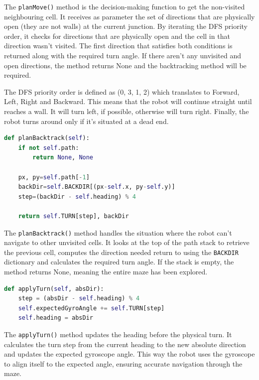 The \texttt{planMove()} method is the decision-making function to get the non-visited neighbouring cell. It receives as parameter the set of directions that are physically open (they are not walls) at the current junction. By iterating the DFS priority order, it checks for directions that are physically open and the cell in that direction wasn’t visited. The first direction that satisfies both conditions is returned along with the required turn angle. If there aren’t any unvisited and open directions, the method returns None and the backtracking method will be required.

The DFS priority order is defined as (0, 3, 1, 2) which translates to Forward, Left, Right and Backward. This means that the robot will continue straight until reaches a wall. It will turn left, if possible, otherwise will turn right. Finally, the robot turns around only if it’s situated at a dead end. 

\begin{lstlisting}[language=Python, caption={MazeMap plan backtrack method}, label={lst:lk-init}]
def planBacktrack(self):
    if not self.path:
        return None, None
    
    px, py=self.path[-1]
    backDir=self.BACKDIR[(px-self.x, py-self.y)]
    step=(backDir - self.heading) % 4
    
    return self.TURN[step], backDir
\end{lstlisting}

The \texttt{planBacktrack()} method handles the situation where the robot can’t navigate to other unvisited cells. It looks at the top of the path stack to retrieve the previous cell, computes the direction needed return to using the \texttt{BACKDIR} dictionary and calculates the required turn angle. If the stack is empty, the method returns None, meaning the entire maze has been explored.

\begin{lstlisting}[language=Python, caption={MazeMap apply turn method}, label={lst:lk-init}]
def applyTurn(self, absDir):
    step = (absDir - self.heading) % 4
    self.expectedGyroAngle += self.TURN[step]   
    self.heading = absDir
\end{lstlisting}

The \texttt{applyTurn()} method updates the heading before the physical turn. It calculates the turn step from the current heading to the new absolute direction and updates the expected gyroscope angle. This way the robot uses the gyroscope to align itself to the expected angle, ensuring accurate navigation through the maze.

